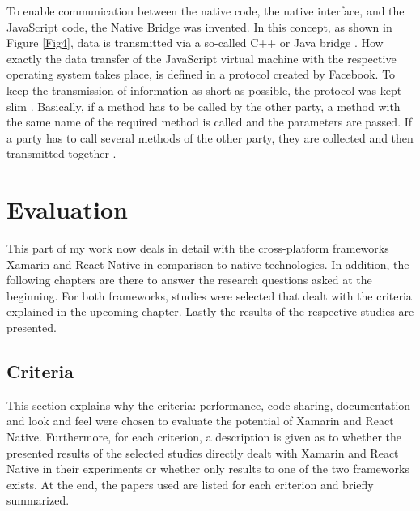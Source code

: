 \documentclass[Bachelor,BIF,english]{twbook}
\begin{document}
To enable communication between the native code, the native interface, and the JavaScript code, the Native Bridge was invented. In this concept, as shown in Figure \ref{Fig4}, data is transmitted via a so-called C++ or Java bridge \cite[p.~28]{ZubaBernhard2017EdPb}. How exactly the data transfer of the JavaScript virtual machine with the respective operating system takes place, is defined in a protocol created by Facebook. To keep the transmission of information as short as possible, the protocol was kept slim \cite[p.~9-10]{Hansson_Vidhall_2016} \cite[p.~28]{ZubaBernhard2017EdPb}. Basically, if a method has to be called by the other party, a method with the same name of the required method is called and the parameters are passed. If a party has to call several methods of the other party, they are collected and then transmitted together \cite[p.~29]{ZubaBernhard2017EdPb}.
\newpage
\chapter{Evaluation}
This part of my work now deals in detail with the cross-platform frameworks Xamarin and React Native in comparison to native technologies. In addition, the following chapters are there to answer the research questions asked at the beginning. For both frameworks, studies were selected that dealt with the criteria explained in the upcoming chapter. Lastly the results of the respective studies are presented.

\section{Criteria}
This section explains why the criteria: performance, code sharing, documentation and look and feel were chosen to evaluate the potential of Xamarin and React Native. Furthermore, for each criterion, a description is given as to whether the presented results of the selected studies directly dealt with Xamarin and React Native in their experiments or whether only results to one of the two frameworks exists. At the end, the papers used are listed for each criterion and briefly summarized.
\end{document}
